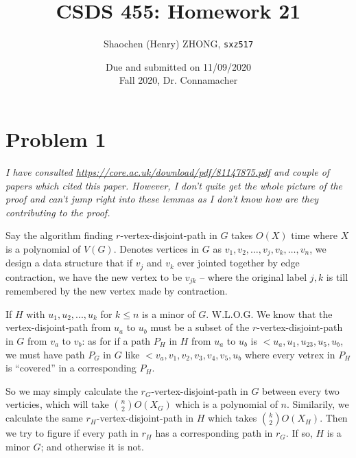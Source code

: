 \documentclass[11pt]{article}
\newcommand{\ilc}{\texttt}
\begin{document}
\title{\textbf{CSDS 455: Homework 21}}

\author{Shaochen (Henry) ZHONG, \ilc{sxz517}}
\date{Due and submitted on 11/09/2020 \\ Fall 2020, Dr. Connamacher}
\maketitle



\section*{Problem 1}

\textit{I have consulted \url{https://core.ac.uk/download/pdf/81147875.pdf} and couple of papers which cited this paper. However, I don't quite get the whole picture of the proof and can't jump right into these lemmas as I don't know how are they contributing to the proof.}\newline

Say the algorithm finding $r$-vertex-disjoint-path in $G$ takes $O(X)$ time where $X$ is a polynomial of $V(G)$. Denotes vertices in $G$ as $v_1, v_2, \dots, v_j, v_k, \dots, v_n$, we design a data structure that if $v_j$ and $v_k$ ever jointed together by edge contraction, we have the new vertex to be $v_{jk}$ -- where the original label $j, k$ is till remembered by the new vertex made by contraction.

If $H$ with $u_1, u_2, ..., u_k$ for $k \leq n$ is a minor of $G$. W.L.O.G. We know that the vertex-disjoint-path from $u_a$ to $u_b$ must be a subset of the $r$-vertex-disjoint-path in $G$ from $v_a$ to $v_b$: as for if a path $P_H$ in $H$ from $u_a$ to $u_b$ is $<u_a, u_1, u_{23}, u_5, u_b$, we must have path $P_G$ in $G$ like $<v_a, v_1, v_2, v_3, v_4, v_5, u_b$ where every vetrex in $P_H$ is ``covered'' in a corresponding $P_H$.

So we may simply calculate the $r_G$-vertex-disjoint-path in $G$ between every two verticies, which will take ${n \choose 2}O(X_G)$ which is a polynomial of $n$. Similarily, we calculate the same $r_H$-vertex-disjoint-path in $H$ which takes ${k \choose 2}O(X_H)$. Then we try to figure if every path in $r_H$ has a corresponding path in $r_G$. If so, $H$ is a minor $G$; and otherwise it is not.
\end{document}
